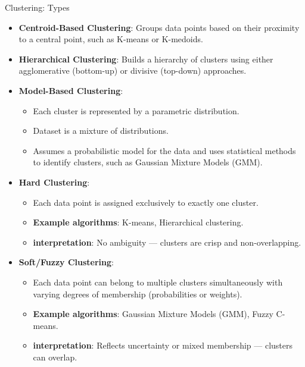\begin{frame}[allowframebreaks]{Clustering: Types}
    \begin{itemize}
        \item \textbf{Centroid-Based Clustering}: Groups data points based on their proximity to a central point, such as K-means or K-medoids.
        \item \textbf{Hierarchical Clustering}: Builds a hierarchy of clusters using either agglomerative (bottom-up) or divisive (top-down) approaches.
        \item \textbf{Model-Based Clustering}:
        \begin{itemize}
            \item Each cluster is represented by a parametric distribution.
            \item Dataset is a mixture of distributions.
            \item Assumes a probabilistic model for the data and uses statistical methods to identify clusters, such as Gaussian Mixture Models (GMM).
        \end{itemize}
        \item \textbf{Hard Clustering}: 
        \begin{itemize}
            \item Each data point is assigned exclusively to exactly one cluster.
            \item \textbf{Example algorithms}: K-means, Hierarchical clustering.
            \item \textbf{interpretation}: No ambiguity — clusters are crisp and non-overlapping.
        \end{itemize}
        \item \textbf{Soft/Fuzzy Clustering}: 
        \begin{itemize}
            \item Each data point can belong to multiple clusters simultaneously with varying degrees of membership (probabilities or weights).
            \item \textbf{Example algorithms}: Gaussian Mixture Models (GMM), Fuzzy C-means.
            \item \textbf{interpretation}: Reflects uncertainty or mixed membership — clusters can overlap.
        \end{itemize}
    \end{itemize}
\end{frame}



